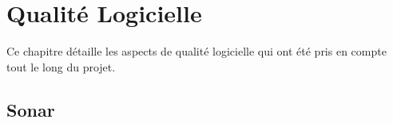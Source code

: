 \chapter{Qualité Logicielle}

Ce chapitre détaille les aspects de qualité logicielle qui ont été pris en compte tout le long du projet.

\section{Sonar}
